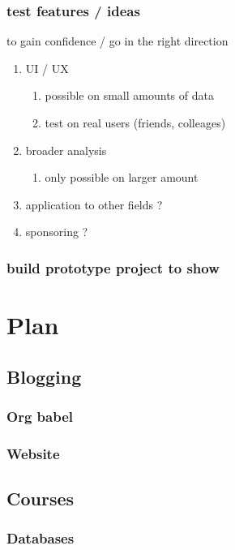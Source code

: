 \documentclass[11pt]{article}
\begin{document}
\subsubsection{test features / ideas}
\label{sec:org98c9144}
to gain confidence / go in the right direction
\begin{enumerate}
\item UI / UX
\label{sec:orgafcf678}
\begin{enumerate}
\item possible on small amounts of data
\label{sec:orgbefee6c}
\item test on real users (friends, colleages)
\label{sec:org1d8790d}
\end{enumerate}
\item broader analysis
\label{sec:org1759ddb}
\begin{enumerate}
\item only possible on larger amount
\label{sec:org355391b}
\end{enumerate}
\item application to other fields ?
\label{sec:org5e4e033}
\item sponsoring ?
\label{sec:org783b116}
\end{enumerate}
\subsubsection{build prototype project to show}
\label{sec:orgd7a821e}
\section{Plan}
\label{sec:org684eab8}
\subsection{Blogging}
\label{sec:org9e877f0}
\subsubsection{Org babel}
\label{sec:org7939331}
\subsubsection{Website}
\label{sec:org527c63c}
\subsection{Courses}
\label{sec:orga92db54}
\subsubsection{Databases}
\label{sec:org166498a}
\end{document}
